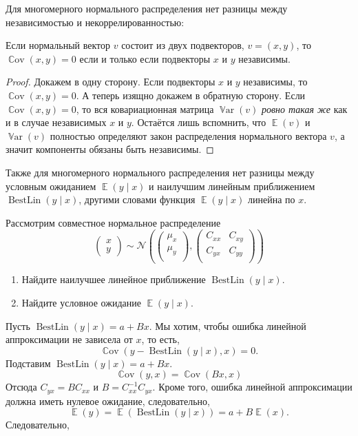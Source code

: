\documentclass[12pt]{article}
\DeclareMathOperator{\Cov}{\mathbb{C}ov}
\DeclareMathOperator{\Var}{\mathbb{V}ar}
\DeclareMathOperator{\BestLin}{BestLin}
\DeclareMathOperator{\E}{\mathbb{E}}
\newcommand{\cN}{\mathcal{N}}
\newenvironment{sol}{}{}
\begin{document}
Для многомерного нормального распределения нет разницы между независимостью и некоррелированностью:
\begin{theorem}
Если нормальный вектор $v$ состоит из двух подвекторов, $v = (x, y)$, то $\Cov(x, y) = 0$ если и только если подвекторы $x$ и $y$ независимы.     
\end{theorem}
\begin{proof}
    Докажем в одну сторону. 
    Если подвекторы $x$ и $y$ независимы, то $\Cov(x, y) = 0$.
    А теперь изящно докажем в обратную сторону. 
    Если $\Cov(x, y) = 0$, то вся ковариационная матрица $\Var(v)$ \emph{ровно такая же} как и в случае независимых $x$ и $y$. 
    Остаётся лишь вспомнить, что $\E(v)$ и $\Var(v)$ полностью определяют закон распределения нормального вектора $v$, а значит компоненты обязаны быть независимы. 
\end{proof}

Также для многомерного нормального распределения нет разницы между условным ожиданием $\E(y \mid x)$ и наилучшим линейным приближением $\BestLin(y \mid x)$, 
другими словами функция $\E(y \mid x)$ линейна по $x$.

\begin{problem}
Рассмотрим совместное нормальное распределение 
\[
\begin{pmatrix}
    x \\
    y 
\end{pmatrix} \sim \cN\left(
\begin{pmatrix}
    \mu_x \\
    \mu_y \\
\end{pmatrix}, 
\begin{pmatrix}
    C_{xx} & C_{xy} \\
    C_{yx} & C_{yy} \\
\end{pmatrix}\right)
\]
\begin{enumerate}
    \item Найдите наилучшее линейное приближение $\BestLin(y \mid x)$.
    \item Найдите условное ожидание $\E(y \mid x)$.    
\end{enumerate}

\begin{sol}
    Пусть $\BestLin(y \mid x)  = a + B x$.
    Мы хотим, чтобы ошибка линейной аппроксимации не зависела от $x$, то есть, 
    \[
    \Cov(y - \BestLin(y \mid x), x) = 0.
    \]
    Подставим $\BestLin(y \mid x ) =a + Bx$.
    \[
    \Cov(y, x) = \Cov(Bx, x)
    \]
    Отсюда $C_{yx} = B C_{xx}$ и $B = C_{xx}^{-1}C_{yx}$.
    Кроме того, ошибка линейной аппроксимации должна иметь нулевое ожидание, следовательно,
    \[
    \E(y) = \E(\BestLin(y \mid x)) = a  + B \E(x).
    \]
    Следовательно, 
\end{sol}

\end{problem}
\end{document}
